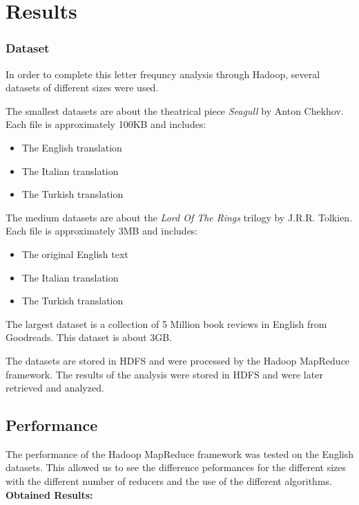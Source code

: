 \chapter{Results}

\subsection{Dataset}
In order to complete this letter frequncy analysis through Hadoop, several datasets of different sizes were used. 

The smallest datasets are about the theatrical piece \textit{Seagull} by Anton Chekhov. Each file is approximately 100KB and includes: 
\begin{itemize}
    \item The English translation
    \item The Italian translation
    \item The Turkish translation
\end{itemize}

The medium datasets are about the \textit{Lord Of The Rings} trilogy by J.R.R. Tolkien. Each file is approximately 3MB and includes: 
\begin{itemize}
    \item The original English text
    \item The Italian translation
    \item The Turkish translation
\end{itemize}

The largest dataset is a collection of 5 Million book reviews in English from Goodreads. This dataset is about 3GB. 
 
The datasets are stored in HDFS and were processed by the Hadoop MapReduce framework. The results of the analysis were stored in HDFS and were later retrieved and analyzed.
\newpage
\section{Performance}
The performance of the Hadoop MapReduce framework was tested on the English datasets. This allowed us to see the difference peformances for the different sizes with the different number of reducers and the use of the different algorithms. \\
\textbf{Obtained Results:}

